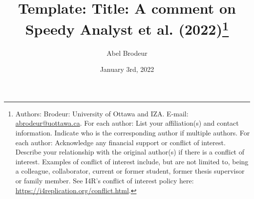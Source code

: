 \documentclass[12pt,a4paper]{article}
\begin{document}
\date{January 3rd, 2022}

\title{Template: Title: A comment on Speedy Analyst et al. (2022)\thanks{Authors: 
Brodeur: University of Ottawa and IZA. E-mail: \href{mailto:abrodeur@uottawa.ca}%
{abrodeur@uottawa.ca}. For each author: List your affiliation(s) and contact information. Indicate who is the corresponding author if multiple authors. For each author: Acknowledge any financial support or conflict of interest. Describe your relationship with the original author(s) if there is a conflict of interest. Examples of conflict of interest include, but are not limited to, being a colleague, collaborator, current or former student, former thesis supervisor or family member. See I4R’s conflict of interest policy here: \url{https://i4replication.org/conflict.html}.}}
\author{Abel Brodeur}

\maketitle
\end{document}
